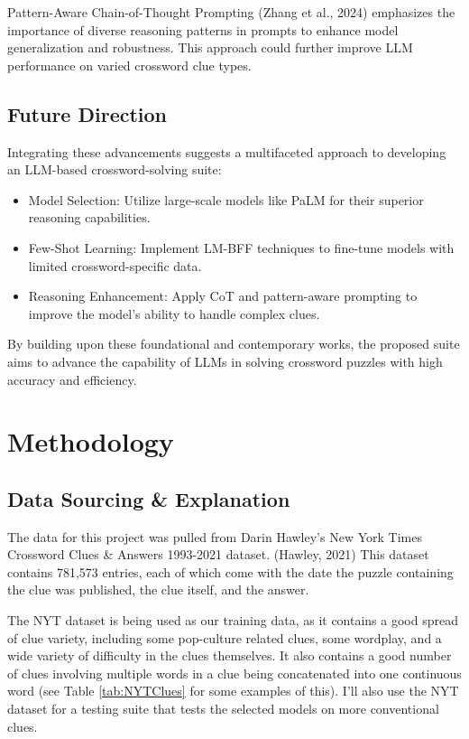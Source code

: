 \documentclass[
	a4paper, %
	10pt, %
	unnumberedsections, %
	twoside, %
]{LTJournalArticle}
\begin{document}
\noindent Pattern-Aware Chain-of-Thought Prompting (Zhang et al., 2024) \cite{zhang2024pattern} emphasizes the importance of diverse reasoning patterns in prompts to enhance model generalization and robustness. This approach could further improve LLM performance on varied crossword clue types.

\subsection{Future Direction}

Integrating these advancements suggests a multifaceted approach to developing an LLM-based crossword-solving suite:
\begin{itemize}
	\item Model Selection: Utilize large-scale models like PaLM for their superior reasoning capabilities.
	
	\item Few-Shot Learning: Implement LM-BFF techniques to fine-tune models with limited crossword-specific data.	
	
	\item Reasoning Enhancement: Apply CoT and pattern-aware prompting to improve the model's ability to handle complex clues.
\end{itemize}



By building upon these foundational and contemporary works, the proposed suite aims to advance the capability of LLMs in solving crossword puzzles with high accuracy and efficiency.




\section{Methodology}

\subsection{Data Sourcing \& Explanation}

The data for this project was pulled from Darin Hawley's New York Times Crossword Clues \& Answers 1993-2021 dataset. (Hawley, 2021) \cite{Hawley2021} This dataset contains 781,573 entries, each of which come with the date the puzzle containing the clue was published, the clue itself, and the answer. 

The NYT dataset is being used as our training data, as it contains a good spread of clue variety, including some pop-culture related clues, some wordplay, and a wide variety of difficulty in the clues themselves. It also contains a good number of clues involving multiple words in a clue being concatenated into one continuous word (see Table \ref{tab:NYTClues} for some examples of this). I'll also use the NYT dataset for a testing suite that tests the selected models on more conventional clues.
\end{document}
